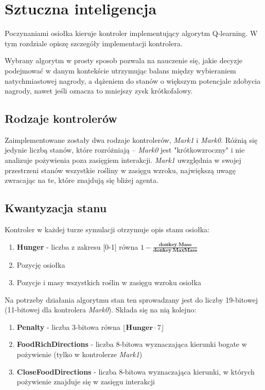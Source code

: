 \chapter{Sztuczna inteligencja}
Poczynaniami osiołka kieruje kontroler implementujący algorytm Q-learning. W tym rozdziale opiszę szczegóły implementacji kontrolera.

Wybrany algorytm w prosty sposob pozwala na nauczenie się, jakie decyzje podejmować w danym kontekście utrzymując balans między wybieraniem natychmiastowej nagrody, a dążeniem do stanów o większym potencjale zdobycia nagrody, nawet jeśli oznacza to mniejszy zysk krótkofalowy. 

\section{Rodzaje kontrolerów}
Zaimplementowane zostały dwa rodzaje kontrolerów, \textit{Mark1} i \textit{Mark0}. Różnią się jedynie liczbą stanów, które rozróżniają -- \textit{Mark0} jest "krótkowzroczny" i nie analizuje pożywienia poza zasięgiem interakcji. \textit{Mark1} uwzględnia w swojej przestrzeni stanów wszystkie rośliny w zasięgu wzroku, największą uwagę zwracając na te, które znajdują się bliżej agenta.

\section{Kwantyzacja stanu}
Kontroler w każdej turze symulacji otrzymuje opis stanu osiołka:
\begin{enumerate}
    \item \textbf{Hunger} - liczba z zakresu [0-1] równa $1-\frac{\textbf{donkey.Mass}}{\textbf{donkey.MaxMass}}$
    \item Pozycję osiołka
    \item Pozycje i masy wszystkich roślin w zasięgu wzroku osiołka
\end{enumerate}
Na potrzeby działania algorytmu stan ten sprowadzany jest do liczby 19-bitowej (11-bitowej dla kontrolera \textit{Mark0}). Składa się na nią kolejno:
\begin{enumerate}
    \item \textbf{Penalty} - liczba 3-bitowa równa $\lfloor\textbf{Hunger}\cdot7\rfloor$
    \item \textbf{FoodRichDirections} - liczba 8-bitowa wyznaczająca kierunki bogate w pożywienie (tylko w kontrolerze \textit{Mark1})
    \item \textbf{CloseFoodDirections} - liczba 8-bitowa wyznaczająca kierunki, w których pożywienie znajduje się w zasięgu interakcji
\end{enumerate}

